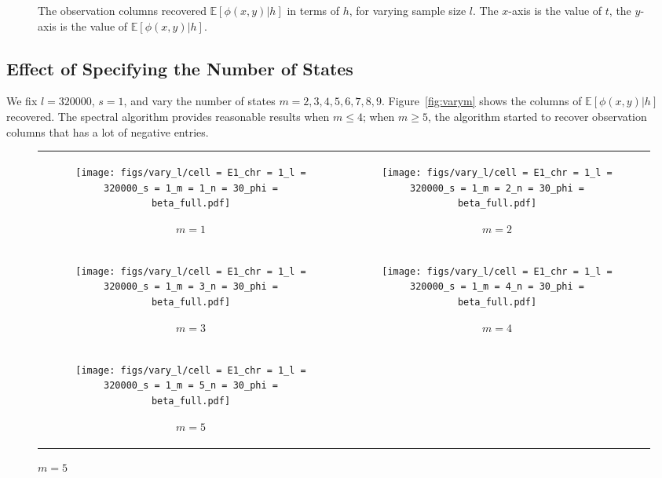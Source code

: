 \documentclass{article}
\def\E{\mathbb{E}}
\begin{document}
{\begin{figure}[H]
    \caption{The observation columns recovered $\E[\phi(x,y)|h]$ in terms of $h$, for varying sample size $l$. The $x$-axis is the value of $t$, the $y$-axis is the value of $\E[\phi(x,y)|h]$.}
    \label{fig:varyl}
\end{figure}

\subsection{Effect of Specifying the Number of States}

We fix $l = 320000$, $s = 1$, and vary the number of states $m = 2,3,4,5,6,7,8,9$. Figure~\ref{fig:varym} shows the columns of $\E[\phi(x,y)|h]$ recovered. The spectral algorithm provides reasonable results when $m \leq 4$; when $m \geq 5$, the algorithm started to recover observation columns that has a lot of negative entries.


\begin{figure}[H]

    \begin{tabular}{cc}
    \begin{subfigure}[t]{0.45\textwidth}
        \texttt{[image: figs/vary\_l/cell = E1\_chr = 1\_l = 320000\_s = 1\_m = 1\_n = 30\_phi = beta\_full.pdf]}
        \caption{$m = 1$}
    \end{subfigure}
    &
    \begin{subfigure}[t]{0.45\textwidth}
        \texttt{[image: figs/vary\_l/cell = E1\_chr = 1\_l = 320000\_s = 1\_m = 2\_n = 30\_phi = beta\_full.pdf]}
        \caption{$m = 2$}
    \end{subfigure}
    \\
    \begin{subfigure}[t]{0.45\textwidth}
        \texttt{[image: figs/vary\_l/cell = E1\_chr = 1\_l = 320000\_s = 1\_m = 3\_n = 30\_phi = beta\_full.pdf]}
        \caption{$m = 3$}
    \end{subfigure}
    &
    \begin{subfigure}[t]{0.45\textwidth}
        \texttt{[image: figs/vary\_l/cell = E1\_chr = 1\_l = 320000\_s = 1\_m = 4\_n = 30\_phi = beta\_full.pdf]}
        \caption{$m = 4$}
    \end{subfigure}
    \\
    \begin{subfigure}[t]{0.45\textwidth}
        \texttt{[image: figs/vary\_l/cell = E1\_chr = 1\_l = 320000\_s = 1\_m = 5\_n = 30\_phi = beta\_full.pdf]}
        \caption{$m = 5$}
    \end{subfigure}
    \end{tabular}


\end{figure}}
\end{document}
